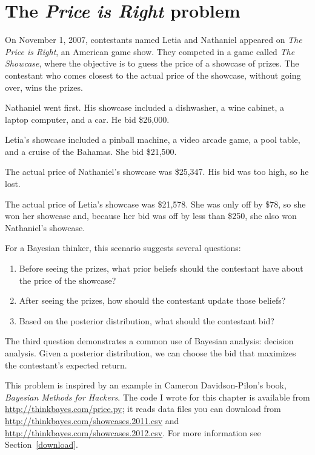\documentclass[12pt]{book}
\begin{document}
\section{The {\it Price is Right} problem}

On November 1, 2007, contestants named Letia and Nathaniel appeared
on {\it The Price is Right}, an American game show.  They competed in
a game called {\it The Showcase}, where the objective is to guess the price
of a showcase of prizes.  The contestant who comes closest to the
actual price of the showcase, without going over, wins the prizes.

Nathaniel went first.  His showcase included a dishwasher, a wine
cabinet, a laptop computer, and a car.  He bid \$26,000.

Letia's showcase included a pinball machine, a video arcade game, a
pool table, and a cruise of the Bahamas.  She bid \$21,500.

The actual price of Nathaniel's showcase was \$25,347.  His bid
was too high, so he lost.

The actual price of Letia's showcase was \$21,578.  She was only
off by \$78, so she won her showcase and, because
her bid was off by less than \$250, she also won Nathaniel's
showcase.

For a Bayesian thinker, this scenario suggests several questions:

\begin{enumerate}

\item Before seeing the prizes, what prior beliefs should the
  contestant have about the price of the showcase?

\item After seeing the prizes, how should the contestant update
  those beliefs?

\item Based on the posterior distribution, what should the
  contestant bid?

\end{enumerate}

The third question demonstrates a common use of Bayesian analysis:
decision analysis.  Given a posterior distribution, we can choose
the bid that maximizes the contestant's expected return.

This problem is inspired by an example in Cameron Davidson-Pilon's
book, {\it Bayesian Methods for Hackers}.  The code I wrote for this
chapter is available from \url{http://thinkbayes.com/price.py}; it
reads data files you can download from
\url{http://thinkbayes.com/showcases.2011.csv} and
\url{http://thinkbayes.com/showcases.2012.csv}.    For more information
see Section~\ref{download}.
\end{document}
